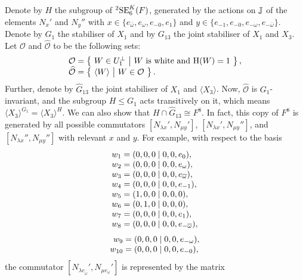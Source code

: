 Denote by $H$ the subgroup of ${}^2\mathrm{SE}_6^K(F)$, generated
by the actions on $\mathbb{J}$ of the elements $N_x'$ and $N_y''$
with $x \in \{e_{\bar{\omega}}, e_{\omega}, e_{-0}, e_1\}$ and 
$y \in \{ e_{-1}, e_{-0}, e_{-\omega}, e_{-\bar{\omega}} \}$.
Denote by $G_1$ the stabiliser of $X_1$ and by $G_{13}$ the
joint stabiliser of $X_1$ and $X_3$. Let $\mathcal{O}$ and
$\hat{\mathcal{O}}$ to be
the following sets:
\begin{equation}
	\begin{array}{r@{\;}c@{\;}l}
	\mathcal{O} & = & 
	\left\{\ W \in U_1^{\perp}\ \big|\ \mbox{$W$ is white and
		$\H(W)=1$ } \right\}, \\
		
	\hat{\mathcal{O}} & = & \left\{ 
		\ \langle W \rangle\ \big|\ W \in \mathcal{O}\ 
	\right\}.
	\end{array}
\end{equation}
Further, denote by $\hat{G}_{13}$ the joint stabiliser
of $X_1$ and $\langle X_3 \rangle$. Now, $\hat{\mathcal{O}}$
is $G_1$-invariant, and the subgroup $H \leqslant G_1$
acts transitively on it, which means 
$\langle X_3 \rangle^{G_1} = \langle X_3 \rangle^H$. We can
also show that $H \cap \hat{G}_{13} \cong F^8$. In fact,
this copy of $F^8$ is generated by all possible commutators
$[N_{\lambda x}', N_{\mu y}']$, $[N_{\lambda x}', N_{\mu y}'']$,
and $[N_{\lambda x}'', N_{\mu y}'']$ with relevant $x$ and $y$.
For example, with respect to the basis
\begin{equation}
	\begin{array}{r@{\;}c@{\;}l}
		w_1 & = & (0,0,0 \mid 0,0,e_0), \\
		w_2 & = & (0,0,0 \mid 0,0,e_{\omega}), \\
		w_3 & = & (0,0,0 \mid 0,0,e_{\bar{\omega}}), \\
		w_4 & = & (0,0,0 \mid 0,0,e_{-1}), \\
		w_5 & = & (1,0,0 \mid 0,0,0), \\
		w_6 & = & (0,1,0 \mid 0,0,0), \\
		w_7 & = & (0,0,0 \mid 0,0,e_1), \\
		w_8 & = & (0,0,0 \mid 0,0,e_{-\bar{\omega}}), 
	\end{array}
\end{equation}
\begin{equation*}
	\begin{array}{r@{\;}c@{\;}l}
		w_9 & = & (0,0,0 \mid 0,0,e_{-\omega}), \\
		w_{10} & = & (0,0,0 \mid 0,0,e_{-0}), \\
	\end{array}
\end{equation*}
the commutator $[N_{\lambda e_{\bar{\omega}}}', 
N_{\mu e_{\omega}}']$ is represented by the matrix 

